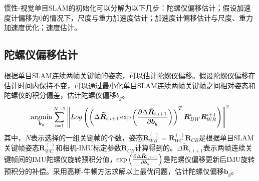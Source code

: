 惯性-视觉单目SLAM的初始化可以分解为以下几步：陀螺仪偏移估计；假设加速度计偏移为0的情况下，尺度与重力加速度估计；加速度计偏移估计与尺度、重力加速度优化；速度估计。

\subsection{陀螺仪偏移估计}
根据单目SLAM连续两帧关键帧的姿态，可以估计陀螺仪偏移。假设陀螺仪偏移在估计时间内保持不变，可以通过最小化单目SLAM连续两帧关键帧之间相对姿态和陀螺仪的积分偏差，估计陀螺仪偏移$b_g$。
\begin{equation}
\label{equ5.28}
\operatorname*{argmin}\limits_{\boldsymbol{b}_g}\sum\limits_{i=1}^{N-1} \left \Vert Log \left( \left( \Delta \widetilde{\boldsymbol{R}}_{i,i+1} \exp \left( { \partial \Delta \bar{\boldsymbol{R}}_{i,i+1} \over \partial \boldsymbol{b}_g  } \right) \right)^T \boldsymbol{R}_{BW}^i \boldsymbol{R}_{W\!B}^{i+1} \right)  \right \Vert^2
\end{equation}
其中，$N$表示选择的一组关键帧的个数，姿态$\boldsymbol{R}_{W\!B}^{(\cdot)}=\boldsymbol{R}_{WC}^{(\cdot)}\boldsymbol{R}_{CB}$是根据单目SLAM关键帧姿态$\boldsymbol{R}_{WC}^{(\cdot)}$和相机-IMU标定参数$\boldsymbol{R}_{CB}$计算得到的。$\Delta \widetilde{\boldsymbol{R}}_{i,i+1}$表示两帧连续关键帧间的IMU陀螺仪旋转预积分值，$\exp \left( { \partial \Delta \bar{\boldsymbol{R}}_{i,i+1} \over \partial \boldsymbol{b}_g  } \right)$是陀螺仪偏移更新后IMU旋转预积分的补偿。采用高斯-牛顿方法求解以上最优问题，估计陀螺仪偏移$\boldsymbol{b}_g$。


